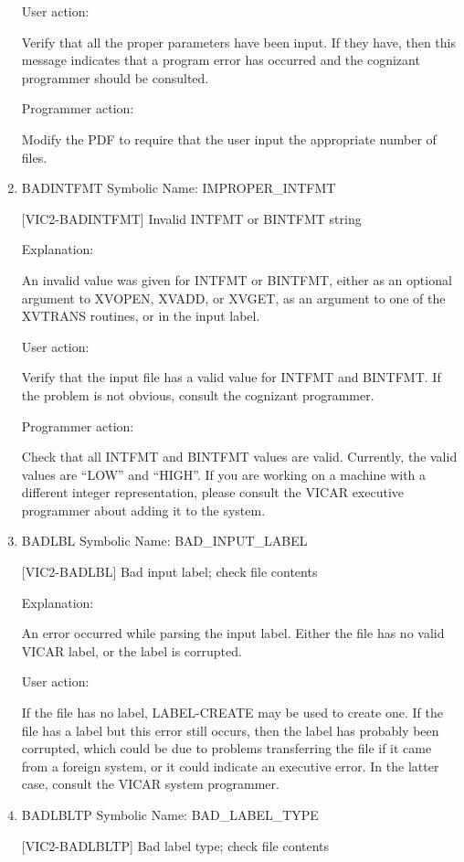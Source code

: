 \begin{enumerate}
User action:

Verify that all the proper parameters have been input.  If they have,
then this message indicates that a program error has occurred and
the cognizant programmer should be consulted.

Programmer action:

Modify the PDF to require that the user input the appropriate
number of files.


\item BADINTFMT Symbolic Name: IMPROPER\_INTFMT

[VIC2-BADINTFMT] Invalid INTFMT or BINTFMT string

Explanation:

An invalid value was given for INTFMT or BINTFMT, either as an optional
argument to XVOPEN, XVADD, or XVGET, as an argument to one of the XVTRANS
routines, or in the input label.

User action:

Verify that the input file has a valid value for INTFMT and BINTFMT.
If the problem is not obvious, consult the cognizant programmer.

Programmer action:

Check that all INTFMT and BINTFMT values are valid.  Currently, the valid
values are ``LOW'' and ``HIGH''.  If you are working on a machine with a
different integer representation, please consult the VICAR executive
programmer about adding it to the system.


\item BADLBL Symbolic Name: BAD\_INPUT\_LABEL

[VIC2-BADLBL] Bad input label; check file contents

Explanation:

An error occurred while parsing the input label.  Either the
file has no valid VICAR label, or the label is corrupted.

User action:

If the file has no label, LABEL-CREATE may be used to create one.
If the file has a label but this error still occurs, then the
label has probably been corrupted, which could be due to problems
transferring the file if it came from a foreign system, or it could
indicate an executive error.  In the latter case, consult the VICAR
system programmer.


\item BADLBLTP Symbolic Name: BAD\_LABEL\_TYPE

[VIC2-BADLBLTP] Bad label type; check file contents


\end{enumerate}
